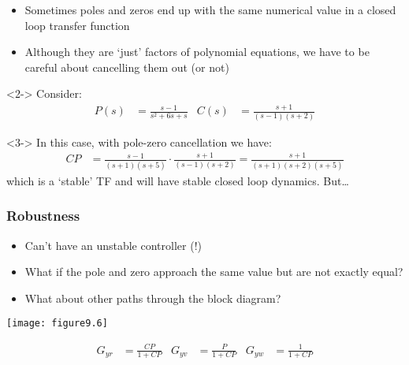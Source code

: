 \documentclass{beamer-control}
\begin{document}
\begin{frame}
\frametitle{}
\begin{itemize}
\item Sometimes poles and zeros end up with the same numerical value in a closed loop transfer function
\item Although they are `just' factors of polynomial equations, we have to be careful about cancelling them out (or not)
\end{itemize}
\begin{uncoverenv}<2->
Consider:
\begin{align}
P(s) &= \frac{s-1}{s^2+6s+s} & C(s) &= \frac{s+1}{(s-1)(s+2)}
\end{align}
\end{uncoverenv}

\begin{uncoverenv}<3->
In this case, with pole-zero cancellation we have:
\begin{align}
CP &= \frac{s-1}{(s+1)(s+5)}\cdot\frac{s+1}{(s-1)(s+2)}=\frac{s+1}{(s+1)(s+2)(s+5)}
\end{align}
which is a `stable' TF and will have stable closed loop dynamics. But\dots
\end{uncoverenv}
\end{frame}

\begin{frame}
\frametitle{Robustness}
\begin{itemize}
\item
Can't have an unstable controller (!)
\item
What if the pole and zero approach the same value but are not exactly equal?
\item
What about other paths through the block diagram?
\end{itemize}
\centerline{\texttt{[image: figure9.6]}}
\begin{align}
G_{yr} &= \frac{CP}{1+CP} &
G_{yv} &= \frac{P}{1+CP} &
G_{yw} &= \frac{1}{1+CP}
\end{align}
\end{frame}

\SUMMARYFRAME
\FINALE
\end{document}
